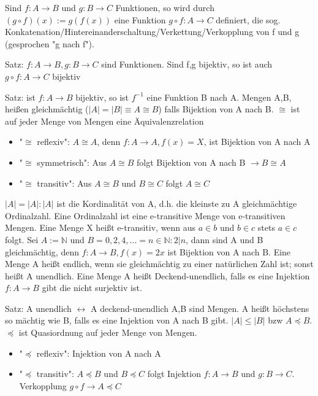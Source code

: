 \documentclass[a4paper]{article}
\begin{document}
\begin{multicols}{3}
    Sind $f:A\rightarrow B$ und $g:B\rightarrow C$ Funktionen, so wird durch $(g \circ f)(x):=g(f(x))$ eine Funktion $g \circ f: A \rightarrow C$ definiert, die sog. Konkatenation/Hintereinanderschaltung/Verkettung/Verkopplung von f und g (gesprochen "g nach f").
    
    Satz: $f:A\rightarrow B, g:B\rightarrow C$ sind Funktionen. Sind f,g bijektiv, so ist auch $g \circ f: A\rightarrow C$ bijektiv
    
    Satz: ist $f:A\rightarrow B$ bijektiv, so ist $f^{-1}$ eine Funktion B nach A. Mengen A,B, heißen gleichmächtig ($|A|=|B| \equiv A\cong B$) falls Bijektion von A nach B. $\cong$ ist auf jeder Menge von Mengen eine Äquivalenzrelation
    \begin{itemize}
        \item "$\cong$ reflexiv": $A\cong A$, denn $f:A\rightarrow A, f(x)=X$, ist Bijektion von A nach A
        \item "$\cong$ symmetrisch": Aus $A\cong B$ folgt Bijektion von A nach B $\rightarrow B\cong A$
        \item "$\cong$ transitiv": Aus $A\cong B$ und $B\cong C$ folgt $A\cong C$
    \end{itemize}
    
    $|A|=|A|:|A|$ ist die Kordinalität von A, d.h. die kleinste zu A gleichmächtige Ordinalzahl. Eine Ordinalzahl ist eine e-transitive Menge von e-transitiven Mengen. Eine Menge X heißt e-transitiv, wenn aus $a\in b$ und $b\in c$ stets $a\in c$ folgt.
    Sei $A:=\mathbb{N}$ und $B={0,2,4,...}={n\in \mathbb{N}: 2|n}$, dann sind A und B gleichmächtig, denn $f:A\rightarrow B, f(x)=2x$ ist Bijektion von A nach B.
    Eine Menge A heißt endlich, wenn sie gleichmächtig zu einer natürlichen Zahl ist; sonst heißt A unendlich.
    Eine Menge A heißt Deckend-unendlich, falls es eine Injektion $f:A\rightarrow B$ gibt die nicht surjektiv ist.
    
    Satz: A unendlich $\leftrightarrow$ A deckend-unendlich
    A,B sind Mengen. A heißt höchstens so mächtig wie B, falls es eine Injektion von A nach B gibt. $|A|\leq |B|$ bzw $A\preceq B$. $\preceq$ ist Quasiordnung auf jeder Menge von Mengen.
    \begin{itemize}
        \item "$\preceq$ reflexiv": Injektion von A nach A
        \item "$\preceq$ transitiv": $A\preceq B$ und $B\preceq C$ folgt Injektion $f:A\rightarrow B$ und $g:B\rightarrow C$. Verkopplung $g \circ f \rightarrow A \preceq C$
    \end{itemize}
    

\end{multicols}
\end{document}
